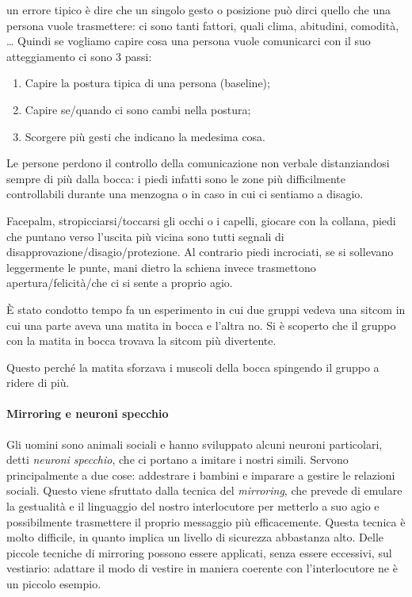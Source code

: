 \noindent un errore tipico è dire che un singolo gesto o posizione può dirci
quello che una persona vuole trasmettere: ci sono tanti fattori, quali clima,
abitudini, comodità, \dots{} Quindi se vogliamo capire cosa una persona vuole
comunicarci con il suo atteggiamento ci sono 3 passi:
\begin{enumerate}
\item Capire la postura tipica di una persona (baseline);
\item Capire se/quando ci sono cambi nella postura;
\item Scorgere più gesti che indicano la medesima cosa.
\end{enumerate}
Le persone perdono il controllo della comunicazione non verbale
distanziandosi sempre di più dalla bocca: i piedi infatti sono le zone più
difficilmente controllabili durante una menzogna o in caso in cui ci sentiamo a
disagio.

Facepalm, stropicciarsi/toccarsi gli occhi o i capelli, giocare con la collana,
piedi che puntano verso l'uscita più vicina sono tutti segnali di
disapprovazione/disagio/protezione. Al contrario piedi incrociati, se si
sollevano leggermente le punte, mani dietro la schiena invece trasmettono
apertura/felicità/che ci si sente a proprio agio.

\begin{example}
È stato condotto tempo fa un esperimento in cui due gruppi vedeva una sitcom
in cui una parte aveva una matita in bocca e l'altra no. Si è scoperto che il
gruppo con la matita in bocca trovava la sitcom più divertente.

\noindent Questo perché la matita sforzava i muscoli della bocca spingendo il
gruppo a ridere di più.
\end{example}

\paragraph*{Mirroring e neuroni specchio}
Gli uomini sono animali sociali e hanno sviluppato alcuni neuroni particolari,
detti \emph{neuroni specchio}, che ci portano a imitare i nostri simili.
Servono principalmente a due cose: addestrare i bambini e imparare a gestire le
relazioni sociali. Questo viene sfruttato dalla tecnica del \emph{mirroring},
che prevede di emulare la gestualità e il linguaggio del nostro interlocutore
per metterlo a suo agio e possibilmente trasmettere il proprio messaggio più
efficacemente. Questa tecnica è molto difficile, in quanto implica un livello
di sicurezza abbastanza alto. Delle piccole tecniche di mirroring possono
essere applicati, senza essere eccessivi, sul vestiario: adattare il modo di
vestire in maniera coerente con l'interlocutore ne è un piccolo esempio.
